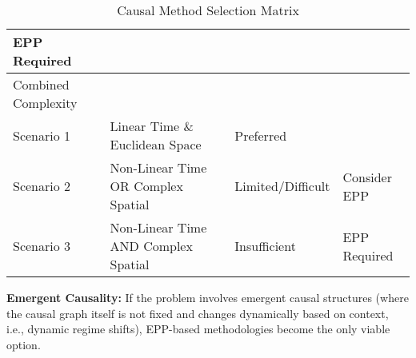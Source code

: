 \begin{table}[hb]
\begin{tabular}{llll}
  \multicolumn{1}{l|}{EPP Required} \\ \hline
\multicolumn{1}{|l|}{Combined Complexity} &
  \multicolumn{1}{l|}{} &
  \multicolumn{1}{l|}{} &
  \multicolumn{1}{l|}{} \\ \hline
\multicolumn{1}{|l|}{Scenario 1} &
  \multicolumn{1}{l|}{Linear Time \& Euclidean Space} &
  \multicolumn{1}{l|}{Preferred} &
  \multicolumn{1}{l|}{} \\ \hline
\multicolumn{1}{|l|}{Scenario 2} &
  \multicolumn{1}{l|}{Non-Linear Time OR Complex Spatial} &
  \multicolumn{1}{l|}{Limited/Difficult} &
  \multicolumn{1}{l|}{Consider EPP} \\ \hline
\multicolumn{1}{|l|}{Scenario 3} &
  \multicolumn{1}{l|}{Non-Linear Time AND Complex Spatial} &
  \multicolumn{1}{l|}{Insufficient} &
  \multicolumn{1}{l|}{EPP Required} \\ \hline
\end{tabular}
\caption{Causal Method Selection Matrix}
\label{tab:method_matrix}
\end{table}

\textbf{Emergent Causality:} If the problem involves emergent causal structures (where the causal graph itself is not fixed and changes dynamically based on context, i.e., dynamic regime shifts), EPP-based methodologies become the only viable option.


\newpage